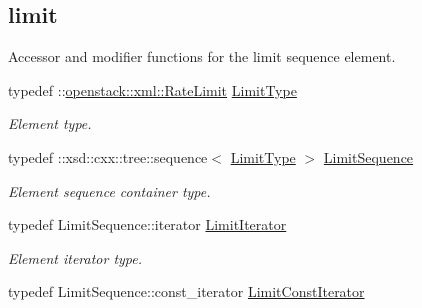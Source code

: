 \subsection*{limit}
\label{_amgrpaa9f73eea60a006820d0f8768bc8a3fc}
Accessor and modifier functions for the limit sequence element. \begin{DoxyCompactItemize}
\item 
\hypertarget{classopenstack_1_1xml_1_1RateLimits_a68d2115a5bad59cbdec85ea75191be5b}{
typedef ::\hyperlink{classopenstack_1_1xml_1_1RateLimit}{openstack::xml::RateLimit} \hyperlink{classopenstack_1_1xml_1_1RateLimits_a68d2115a5bad59cbdec85ea75191be5b}{LimitType}}
\label{classopenstack_1_1xml_1_1RateLimits_a68d2115a5bad59cbdec85ea75191be5b}

\begin{DoxyCompactList}\small\item\em Element type. \item\end{DoxyCompactList}\item 
\hypertarget{classopenstack_1_1xml_1_1RateLimits_a51412c2aa554f271b6bca7986198bcb9}{
typedef ::xsd::cxx::tree::sequence$<$ \hyperlink{classopenstack_1_1xml_1_1RateLimit}{LimitType} $>$ \hyperlink{classopenstack_1_1xml_1_1RateLimits_a51412c2aa554f271b6bca7986198bcb9}{LimitSequence}}
\label{classopenstack_1_1xml_1_1RateLimits_a51412c2aa554f271b6bca7986198bcb9}

\begin{DoxyCompactList}\small\item\em Element sequence container type. \item\end{DoxyCompactList}\item 
\hypertarget{classopenstack_1_1xml_1_1RateLimits_a721faaf43d91af3756a53fb0fe1bb529}{
typedef LimitSequence::iterator \hyperlink{classopenstack_1_1xml_1_1RateLimits_a721faaf43d91af3756a53fb0fe1bb529}{LimitIterator}}
\label{classopenstack_1_1xml_1_1RateLimits_a721faaf43d91af3756a53fb0fe1bb529}

\begin{DoxyCompactList}\small\item\em Element iterator type. \item\end{DoxyCompactList}\item 
\hypertarget{classopenstack_1_1xml_1_1RateLimits_a33a1404c13d9ca0f6dcc6973246e1238}{
typedef LimitSequence::const\_\-iterator \hyperlink{classopenstack_1_1xml_1_1RateLimits_a33a1404c13d9ca0f6dcc6973246e1238}{LimitConstIterator}}
\label{classopenstack_1_1xml_1_1RateLimits_a33a1404c13d9ca0f6dcc6973246e1238}


\end{DoxyCompactItemize}
